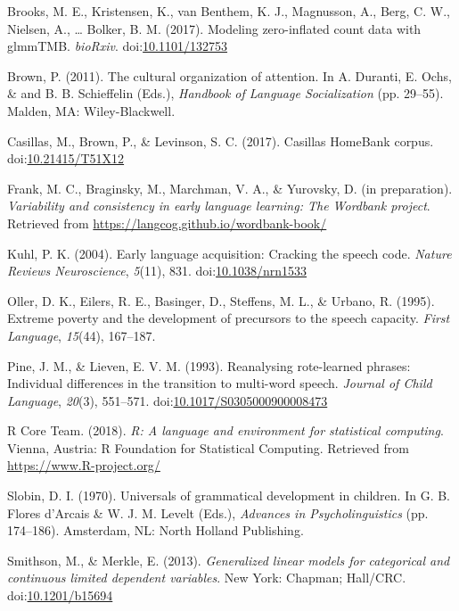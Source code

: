 \documentclass[,man,floatsintext]{apa6}
\begin{document}
\hypertarget{ref-brooks2017modeling}{}
Brooks, M. E., Kristensen, K., van Benthem, K. J., Magnusson, A., Berg,
C. W., Nielsen, A., \ldots{} Bolker, B. M. (2017). Modeling
zero-inflated count data with glmmTMB. \emph{bioRxiv}.
doi:\href{https://doi.org/10.1101/132753}{10.1101/132753}

\hypertarget{ref-brown2011cultural}{}
Brown, P. (2011). The cultural organization of attention. In A. Duranti,
E. Ochs, \& and B. B. Schieffelin (Eds.), \emph{Handbook of Language
Socialization} (pp. 29--55). Malden, MA: Wiley-Blackwell.

\hypertarget{ref-Casillas-HB}{}
Casillas, M., Brown, P., \& Levinson, S. C. (2017). Casillas HomeBank
corpus. doi:\href{https://doi.org/10.21415/T51X12}{10.21415/T51X12}

\hypertarget{ref-frankIPvariability}{}
Frank, M. C., Braginsky, M., Marchman, V. A., \& Yurovsky, D. (in
preparation). \emph{Variability and consistency in early language
learning: The Wordbank project}. Retrieved from
\url{https://langcog.github.io/wordbank-book/}

\hypertarget{ref-kuhl2004early}{}
Kuhl, P. K. (2004). Early language acquisition: Cracking the speech
code. \emph{Nature Reviews Neuroscience}, \emph{5}(11), 831.
doi:\href{https://doi.org/10.1038/nrn1533}{10.1038/nrn1533}

\hypertarget{ref-oller1995extreme}{}
Oller, D. K., Eilers, R. E., Basinger, D., Steffens, M. L., \& Urbano,
R. (1995). Extreme poverty and the development of precursors to the
speech capacity. \emph{First Language}, \emph{15}(44), 167--187.

\hypertarget{ref-pine1993reanalysing}{}
Pine, J. M., \& Lieven, E. V. M. (1993). Reanalysing rote-learned
phrases: Individual differences in the transition to multi-word speech.
\emph{Journal of Child Language}, \emph{20}(3), 551--571.
doi:\href{https://doi.org/10.1017/S0305000900008473}{10.1017/S0305000900008473}

\hypertarget{ref-R-base}{}
R Core Team. (2018). \emph{R: A language and environment for statistical
computing}. Vienna, Austria: R Foundation for Statistical Computing.
Retrieved from \url{https://www.R-project.org/}

\hypertarget{ref-slobin1970universals}{}
Slobin, D. I. (1970). Universals of grammatical development in children.
In G. B. Flores d'Arcais \& W. J. M. Levelt (Eds.), \emph{Advances in
Psycholinguistics} (pp. 174--186). Amsterdam, NL: North Holland
Publishing.

\hypertarget{ref-smithson2013generalized}{}
Smithson, M., \& Merkle, E. (2013). \emph{Generalized linear models for
categorical and continuous limited dependent variables}. New York:
Chapman; Hall/CRC.
doi:\href{https://doi.org/10.1201/b15694}{10.1201/b15694}
\end{document}
